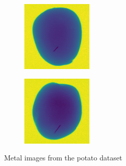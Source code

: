 \documentclass[11pt]{article}
\begin{document}
\begin{figure}[!h]
\begin{subfigure}[b]{0.22\textwidth}
         \caption{}
         \label{fig:metal_17}
     \end{subfigure}
     \hfill
     \begin{subfigure}[b]{0.22\textwidth}
         \centering
         \includegraphics[width=\textwidth]{figurer/potato_dataset/metal/metal_18.jpg}
         \caption{}
         \label{fig:metal_18}
     \end{subfigure}
     \hfill
     \begin{subfigure}[b]{0.22\textwidth}
         \centering
         \includegraphics[width=\textwidth]{figurer/potato_dataset/metal/metal_19.jpg}
         \caption{}
         \label{fig:metal_19}
     \end{subfigure}
     \caption{Metal images from the potato dataset}
    \end{figure}
\end{document}
